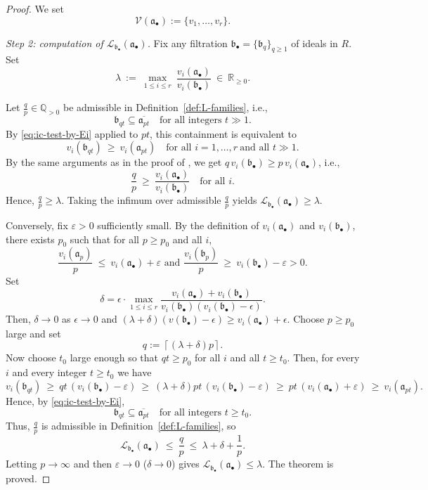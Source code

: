 \documentclass[12pt]{amsart}
\newcommand{\QQ}{\mathbb{Q}}
\newcommand{\RR}{\mathbb{R}}
\renewcommand{\a}{\mathfrak{a}}
\renewcommand{\b}{\mathfrak{b}}
\newcommand{\Loj}{\mathcal{L}} %
\newcommand{\abul}{{\a_\bullet}}
\newcommand{\bbul}{{\b_\bullet}}
\theoremstyle{plain}
\theoremstyle{definition}
\numberwithin{equation}{section}
\begin{document}
\begin{proof}
	We set
	\[
	\mathcal V(\abul):=\{v_1,\dots,v_r\}.
	\]
		
		\smallskip
		\noindent\textit{Step 2: computation of $\Loj_{\bbul}(\abul)$.}
		Fix any filtration $\bbul=\{\b_q\}_{q\ge 1}$ of ideals in $R$.
		Set
		\[
		\lambda\ :=\ \max_{1\le i\le r}\ \frac{v_i(\abul)}{v_i(\bbul)}\ \in\ \RR_{\ge 0}.
		\]
	
		Let $\frac{q}{p}\in\QQ_{>0}$ be admissible in Definition~\ref{def:L-families}, i.e.,
		\[
		\b_{qt}\subseteq \overline{\a_{pt}}
		\quad\text{for all integers }t\gg 1.
		\]
		By \eqref{eq:ic-test-by-Ei} applied to $pt$, this containment is equivalent to
		\[
		v_i(\b_{qt})\ \ge\ v_i(\a_{pt})
		\quad\text{for all }i=1,\dots,r\ \text{and all }t\gg 1.
		\]
		By the same arguments as in the proof of , we get
	$q\,v_i(\bbul)\ge p\,v_i(\abul)$, i.e.,
		\[
		\frac{q}{p}\ \ge\ \frac{v_i(\abul)}{v_i(\bbul)}\quad\text{for all } i.
		\]
	Hence, $\frac{q}{p}\ge \lambda$. Taking the infimum over admissible \(\frac{q}{p}\) yields
		\(\Loj_{\bbul}(\abul)\ge \lambda\).
		
		Conversely, fix $\varepsilon>0$ sufficiently small. 
		By the definition of $v_i(\abul)$ and $v_i(\bbul)$, there exists $p_0$
		such that for all $p\ge p_0$ and all $i$,
		\[
		\frac{v_i(\a_p)}{p}\ \le\ v_i(\abul)+\varepsilon
	\text{ and }
		\frac{v_i(\b_p)}{p}\ \ge\ v_i(\bbul)-\varepsilon > 0.
		\]
    Set $$\delta = \epsilon \cdot \max\limits_{1 \le i \le r}\frac{v_i(\abul) + v_i(\bbul)}{v_i(\bbul)(v_i(\bbul)-\epsilon)}.$$
    Then, $\delta \rightarrow 0$ as $\epsilon \rightarrow 0$ and 
    $(\lambda + \delta)(v(\bbul)-\epsilon) \ge v_i(\abul)+\epsilon.$
		Choose $p\ge p_0$ large and set
		$$q:=\left\lceil(\lambda+\delta)p\right\rceil.$$
		Now choose $t_0$ large enough so that $qt\ge p_0$ for all $i$ and all $t\ge t_0$.
		Then, for every $i$ and every integer $t\ge t_0$ we have
		\[
		v_i(\b_{qt})\ \ge\ qt\,(v_i(\bbul)-\varepsilon)
		\ \ge\ (\lambda+\delta)pt\,(v_i(\bbul)-\varepsilon)
		\ \ge\ pt\,(v_i(\abul)+\varepsilon)
		\ \ge\ v_i(\a_{pt}).
		\]
		Hence, by \eqref{eq:ic-test-by-Ei},
		\[
		\b_{qt}\subseteq \overline{\a_{pt}}
		\quad\text{for all integers }t\ge t_0.
		\]
		Thus, $\frac{q}{p}$ is admissible in Definition~\ref{def:L-families}, so
		\[
		\Loj_{\bbul}(\abul)\ \le\ \frac{q}{p}\ \le\ \lambda+\delta+\frac{1}{p}.
		\]
		Letting $p\to\infty$ and then $\varepsilon\to 0$ ($\delta \to 0$) gives $\Loj_{\bbul}(\abul)\le \lambda$.
		The theorem is proved.
	\end{proof}
\end{document}
